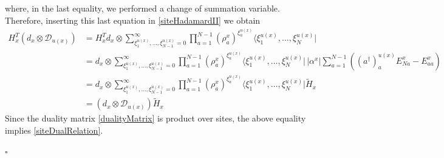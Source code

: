 \documentclass[10pt]{article}
\numberwithin{equation}{section}
\numberwithin{equation}{subsection}
\newcommand{\dd}{\mathcal{D}_{u(x)}}
\begin{document}
where, in the last equality, we performed a change of summation variable. Therefore, inserting this last equation in \eqref{siteHadamardII} we obtain 
\begin{equation}
    \begin{split}
H_{x}^{T}\left(d_{x}\otimes \dd\right)&=
     H_{x}^{T}d_{x}\otimes \sum_{\xi_{1}^{u(x)},\ldots,\xi_{N-1}^{u(x)}=0}^{\infty}\prod_{a=1}^{N-1}\left(\rho_{a}^{x}\right)^{\xi_{a}^{u(x)}}\langle \xi_{1}^{u(x)},\ldots,\xi_{N}^{u(x)}|
\\&=
d_{x}\otimes \sum_{\xi_{1}^{u(x)},\ldots,\xi_{N-1}^{u(x)}=0}^{\infty}\prod_{a=1}^{N-1}\left(\rho_{a}^{x}\right)^{\xi_{a}^{u(x)}}\langle \xi_{1}^{u(x)},\ldots,\xi_{N}^{u(x)}|\,|\alpha^{x}|\sum_{a=1}^{N-1}\left((a^{\dagger})_{a}^{u(x)}E_{Na}^{x}-E_{aa}^{x}\right)   
\\&=
d_{x}\otimes \sum_{\xi_{1}^{u(x)},\ldots,\xi_{N-1}^{u(x)}=0}^{\infty}\prod_{a=1}^{N-1}\left(\rho_{a}^{x}\right)^{\xi_{a}^{u(x)}}\langle \xi_{1}^{u(x)},\ldots,\xi_{N}^{u(x)}|\widetilde{H}_{x}
\\&=
\left(d_{x}\otimes \dd\right)\widetilde{H}_{x}
    \end{split}
\end{equation}
Since the duality matrix \eqref{dualityMatrix} is product over sites, the above equality implies \eqref{siteDualRelation}. 
\begin{flushright}
$\square$
\end{flushright}
\end{document}
